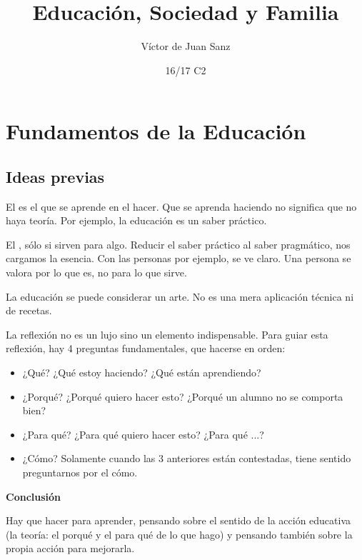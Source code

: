 \documentclass[palatino]{apuntesURJC}
\title{Educación, Sociedad y Familia}
\author{Víctor de Juan Sanz}
\date{16/17 C2}
\renewcommand{\hl}[1]{#1}
\renewcommand{\ul}[1]{#1}
\begin{document}
\pagestyle{plain}
\maketitle

\tableofcontents
\newpage


\chapter{Fundamentos de la Educación}

\section{Ideas previas}

El  es el que se aprende en el hacer.
%
Que se aprenda haciendo no significa que no haya teoría.
%
Por ejemplo, la educación es un saber práctico.


El , sólo si sirven para algo.
%
Reducir el saber práctico al saber pragmático, nos cargamos la esencia.
%
Con las personas por ejemplo, se ve claro.
%
Una persona se valora por lo que es, no para lo que sirve.


La \hl{educación} se puede considerar \hl{un arte}.
%
No es una mera aplicación técnica ni de recetas.

\hl{La reflexión no es un lujo sino un elemento indispensable.}
%
Para guiar esta reflexión, hay 4 preguntas fundamentales, que hacerse en orden:
%
\begin{itemize}
	\item \ul{¿Qué?} ¿Qué estoy haciendo? ¿Qué están aprendiendo?
	\item \ul{¿Porqué?} ¿Porqué quiero hacer esto? ¿Porqué un alumno no se comporta bien?
	\item \ul{¿Para qué?} ¿Para qué quiero hacer esto? ¿Para qué ...?
	\item \ul{¿Cómo?} \subitem Solamente cuando las 3 anteriores están contestadas, tiene sentido preguntarnos por el cómo.
\end{itemize}



\textbf{Conclusión}

Hay que \ul{hacer para aprender}, \ul{pensando} sobre el \ul{sentido} de la acción educativa (la teoría: el porqué y el para qué de lo que hago) \ul{y} pensando también sobre la propia \ul{acción para mejorarla}.
\end{document}
